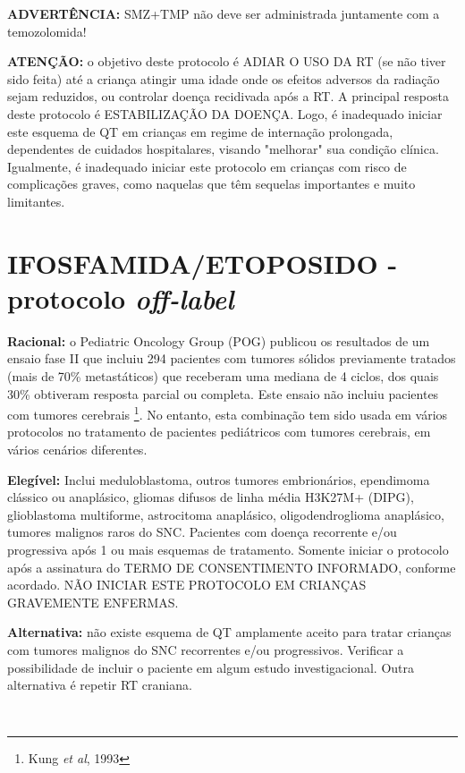 \documentclass[11pt,a4paper,oldfontcommands]{memoir}
\begin{document}
\textbf{ADVERTÊNCIA:} SMZ+TMP não deve ser administrada juntamente com a temozolomida!

\textbf{ATENÇÃO:} o objetivo deste protocolo é ADIAR O USO DA RT (se não tiver sido feita) até a criança atingir uma idade onde os efeitos adversos da radiação sejam reduzidos, ou controlar doença recidivada após a RT. A principal resposta deste protocolo é ESTABILIZAÇÃO DA DOENÇA. Logo, é inadequado iniciar este esquema de QT em crianças em regime de internação prolongada, dependentes de cuidados hospitalares, visando "melhorar" sua condição clínica. Igualmente, é inadequado iniciar este protocolo em crianças com risco de complicações graves, como naquelas que têm sequelas importantes e muito limitantes.

\cleardoublepage
\section{IFOSFAMIDA/ETOPOSIDO - protocolo \textit{off-label}}
{\let\thefootnote\relax{}}
\textbf{Racional:} o Pediatric Oncology Group (POG) publicou os resultados de um ensaio fase II que incluiu 294 pacientes com tumores sólidos previamente tratados (mais de 70\% metastáticos) que receberam uma mediana de 4 ciclos, dos quais 30\% obtiveram resposta parcial ou completa. Este ensaio não incluiu pacientes com tumores cerebrais \footnote{Kung \textit{et al}, 1993}. No entanto, esta combinação tem sido usada em vários protocolos no tratamento de pacientes pediátricos com tumores cerebrais, em vários cenários diferentes.

\textbf{Elegível:} Inclui meduloblastoma, outros tumores embrionários, ependimoma clássico ou anaplásico, gliomas difusos de linha média H3K27M+ (DIPG), glioblastoma multiforme, astrocitoma anaplásico, oligodendroglioma anaplásico, tumores malignos raros do SNC. Pacientes com doença recorrente e/ou progressiva após 1 ou mais esquemas de tratamento. Somente iniciar o protocolo após a assinatura do TERMO DE CONSENTIMENTO INFORMADO, conforme acordado. NÃO INICIAR ESTE PROTOCOLO EM CRIANÇAS GRAVEMENTE ENFERMAS.

\textbf{Alternativa:} não existe esquema de QT amplamente aceito para tratar crianças com tumores malignos do SNC recorrentes e/ou progressivos. Verificar a possibilidade de incluir o paciente em algum estudo investigacional. Outra alternativa é repetir RT craniana.

\hfill \\
\end{document}
